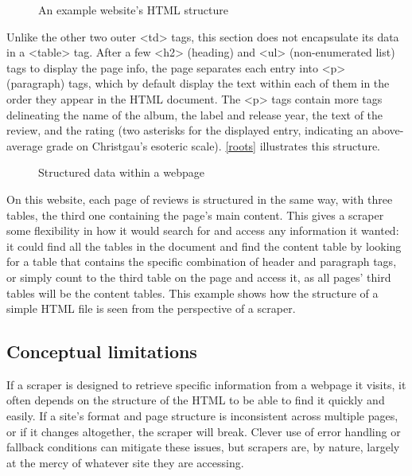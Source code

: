 \begin{figure}[!ht]
	\begin{center}
		\caption{An example website's HTML structure}\label{htmltree}
	\end{center}
\end{figure}

Unlike the other two outer <td> tags, this section does not encapsulate its data in a <table> tag. After a few <h2> (heading) and <ul> (non-enumerated list) tags to display the page info, the page separates each entry into <p> (paragraph) tags, which by default display the text within each of them in the order they appear in the HTML document. The <p> tags contain more tags delineating the name of the album, the label and release year, the text of the review, and the rating (two asterisks for the displayed entry, indicating an above-average grade on Christgau's esoteric scale). \autoref{roots} illustrates this structure.

\begin{figure}[!ht]
	\begin{center}
		\caption{Structured data within a webpage}\label{roots}
	\end{center}
\end{figure}

On this website, each page of reviews is structured in the same way, with three tables, the third one containing the page's main content. This gives a scraper some flexibility in how it would search for and access any information it wanted: it could find all the tables in the document and find the content table by looking for a table that contains the specific combination of header and paragraph tags, or simply count to the third table on the page and access it, as all pages' third tables will be the content tables. This example shows how the structure of a simple HTML file is seen from the perspective of a scraper. 

\subsection{Conceptual limitations}

If a scraper is designed to retrieve specific information from a webpage it visits, it often depends on the structure of the HTML to be able to find it quickly and easily. If a site's format and page structure is inconsistent across multiple pages, or if it changes altogether, the scraper will break. Clever use of error handling or fallback conditions can mitigate these issues, but scrapers are, by nature, largely at the mercy of whatever site they are accessing.

